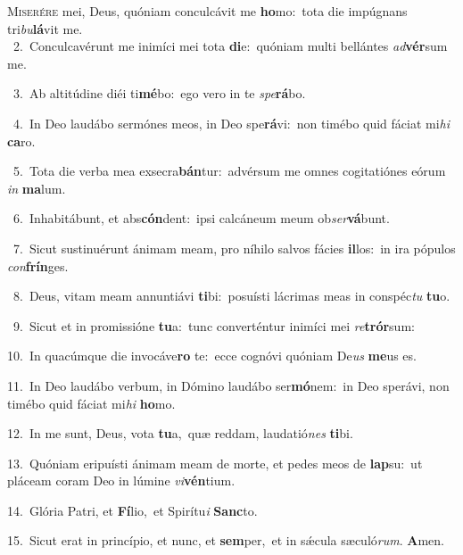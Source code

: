 \lettrine{\initial\textcolor{\initialcolor}{M}}{iserére} mei, Deus, quóniam conculcávit me \textbf{ho}\-mo:~\star tota die impúgnans tri\-\textit{bu}\-\textbf{lá}vit me.\\
{\numbfont\textcolor{\numbcolor}{~2.}}~Conculcavérunt me inimíci mei tota \textbf{di}\-e:~\star quóniam multi bellántes \textit{ad}\-\textbf{vér}sum me.\par
{\numbfont\textcolor{\numbcolor}{~3.}}~Ab altitúdine diéi ti\-\textbf{mé}\-bo:~\star ego vero in te \textit{spe}\-\textbf{rá}bo.\par
{\numbfont\textcolor{\numbcolor}{~4.}}~In Deo laudábo sermónes meos, in Deo spe\-\textbf{rá}\-vi:~\star non timébo quid fáciat mi\textit{hi} \textbf{ca}\-ro.\par
{\numbfont\textcolor{\numbcolor}{~5.}}~Tota die verba mea exsecra\-\textbf{bán}\-tur:~\star advérsum me omnes cogitatiónes eórum \textit{in} \textbf{ma}\-lum.\par
{\numbfont\textcolor{\numbcolor}{~6.}}~Inhabitábunt, et abs\-\textbf{cón}\-dent:~\star ipsi calcáneum meum ob\-\textit{ser}\-\textbf{vá}bunt.\par
{\numbfont\textcolor{\numbcolor}{~7.}}~Sicut sustinuérunt ánimam meam, pro níhilo salvos fácies \textbf{il}\-los:~\star in ira pópulos \textit{con}\-\textbf{frín}ges.\par
{\numbfont\textcolor{\numbcolor}{~8.}}~Deus, vitam meam annuntiávi \textbf{ti}\-bi:~\star posuísti lácrimas meas in conspéc\textit{tu} \textbf{tu}\-o.\par
{\numbfont\textcolor{\numbcolor}{~9.}}~Sicut et in promissióne \textbf{tu}\-a:~\star tunc converténtur inimíci mei \textit{re}\-\textbf{trór}sum:\par
{\numbfont\textcolor{\numbcolor}{10.}}~In quacúmque die invocáve\textbf{ro} te:~\star ecce cognóvi quóniam De\textit{us} \textbf{me}\-us es.\par
{\numbfont\textcolor{\numbcolor}{11.}}~In Deo laudábo verbum, in Dómino laudábo ser\-\textbf{mó}\-nem:~\star in Deo sperávi, non timébo quid fáciat mi\textit{hi} \textbf{ho}\-mo.\par
{\numbfont\textcolor{\numbcolor}{12.}}~In me sunt, Deus, vota \textbf{tu}\-a,~\star quæ reddam, laudatió\textit{nes} \textbf{ti}\-bi.\par
{\numbfont\textcolor{\numbcolor}{13.}}~Quóniam eripuísti ánimam meam de morte, et pedes meos de \textbf{lap}\-su:~\star ut pláceam coram Deo in lúmine \textit{vi}\-\textbf{vén}tium.\par
{\numbfont\textcolor{\numbcolor}{14.}}~Glória Patri, et \textbf{Fí}\-lio,~\star et Spirítu\textit{i} \textbf{Sanc}\-to.\par
{\numbfont\textcolor{\numbcolor}{15.}}~Sicut erat in princípio, et nunc, et \textbf{sem}\-per,~\star et in sǽcula sæculó\-\textit{rum}\-. \textbf{A}\-men.\par
